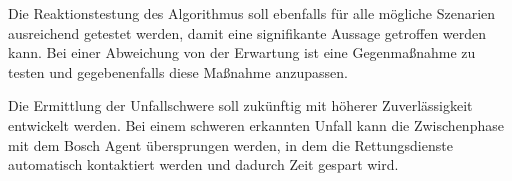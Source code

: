 Die Reaktionstestung des Algorithmus soll ebenfalls für alle mögliche Szenarien ausreichend getestet werden, damit eine signifikante Aussage getroffen werden kann. Bei einer Abweichung von der Erwartung ist eine Gegenmaßnahme zu testen und gegebenenfalls diese Maßnahme anzupassen.

Die Ermittlung der Unfallschwere soll zukünftig mit höherer Zuverlässigkeit entwickelt werden. Bei einem schweren erkannten Unfall kann die Zwischenphase mit dem Bosch Agent übersprungen werden, in dem die Rettungsdienste automatisch kontaktiert werden und dadurch Zeit gespart wird.

%
%
%
